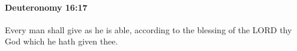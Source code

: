 
		\paragraph{Deuteronomy 16:17} %
			\label{DEUTERONOMY-16-17}

			Every man shall give as he is able, according to the blessing of the LORD thy God which he hath given thee.


